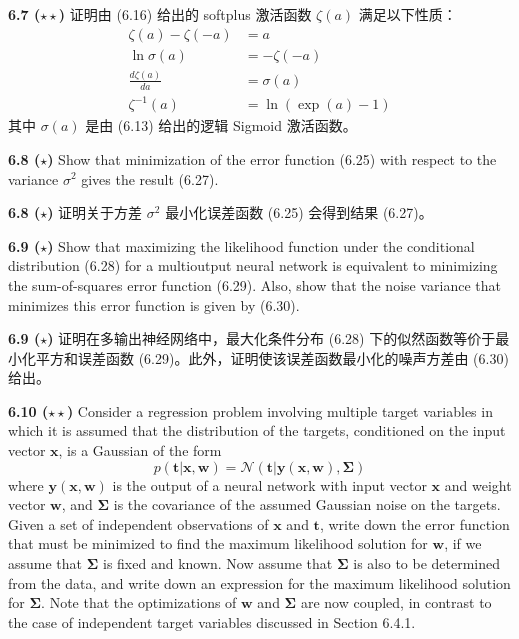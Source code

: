 \documentclass{article}
\begin{document}
\textbf{6.7 ($\star\star$)} 证明由 (6.16) 给出的 softplus 激活函数 $\zeta(a)$ 满足以下性质：
\begin{align}
\zeta(a) - \zeta(-a) &= a \tag{6.62} \\
\ln \sigma(a) &= -\zeta(-a) \tag{6.63} \\
\frac{d\zeta(a)}{da} &= \sigma(a) \tag{6.64} \\
\zeta^{-1}(a) &= \ln(\exp(a)-1) \tag{6.65}
\end{align}
其中 $\sigma(a)$ 是由 (6.13) 给出的逻辑 Sigmoid 激活函数。

\vspace{1em}

\textbf{6.8 ($\star$)} Show that minimization of the error function (6.25) with respect to the variance $\sigma^2$ gives the result (6.27).

\textbf{6.8 ($\star$)} 证明关于方差 $\sigma^2$ 最小化误差函数 (6.25) 会得到结果 (6.27)。

\vspace{1em}

\textbf{6.9 ($\star$)} Show that maximizing the likelihood function under the conditional distribution (6.28) for a multioutput neural network is equivalent to minimizing the sum-of-squares error function (6.29). Also, show that the noise variance that minimizes this error function is given by (6.30).

\textbf{6.9 ($\star$)} 证明在多输出神经网络中，最大化条件分布 (6.28) 下的似然函数等价于最小化平方和误差函数 (6.29)。此外，证明使该误差函数最小化的噪声方差由 (6.30) 给出。

\vspace{1em}

\textbf{6.10 ($\star\star$)} Consider a regression problem involving multiple target variables in which it is assumed that the distribution of the targets, conditioned on the input vector $\mathbf{x}$, is a Gaussian of the form
\begin{equation}
p(\mathbf{t}|\mathbf{x}, \mathbf{w}) = \mathcal{N}(\mathbf{t}|\mathbf{y}(\mathbf{x}, \mathbf{w}), \boldsymbol{\Sigma})
\tag{6.66}
\end{equation}
where $\mathbf{y}(\mathbf{x}, \mathbf{w})$ is the output of a neural network with input vector $\mathbf{x}$ and weight vector $\mathbf{w}$, and $\boldsymbol{\Sigma}$ is the covariance of the assumed Gaussian noise on the targets. Given a set of independent observations of $\mathbf{x}$ and $\mathbf{t}$, write down the error function that must be minimized to find the maximum likelihood solution for $\mathbf{w}$, if we assume that $\boldsymbol{\Sigma}$ is fixed and known. Now assume that $\boldsymbol{\Sigma}$ is also to be determined from the data, and write down an expression for the maximum likelihood solution for $\boldsymbol{\Sigma}$. Note that the optimizations of $\mathbf{w}$ and $\boldsymbol{\Sigma}$ are now coupled, in contrast to the case of independent target variables discussed in Section 6.4.1.
\end{document}
